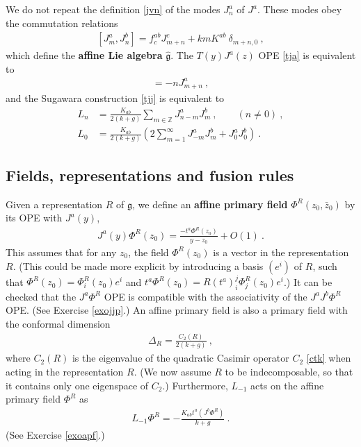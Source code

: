 \documentclass[12pt, a4paper, notitlepage, twoside]{report}
\numberwithin{equation}{section}
\theoremstyle{break}
\begin{document}
We do not repeat the definition \eqref{jvn} of the modes $J^a_n$ of $J^a$.
These modes obey the commutation relations
\begin{align}
 \boxed{[J^a_m,J^b_n] =   f^{ab}_c J^c_{m+n} +kmK^{ab}\ \delta_{m+n,0}} \ , 
\label{jam}
\end{align}
which define the \textbf{\boldmath affine Lie algebra} $\hat{\mathfrak{g}}$. 
The $T(y)J^a(z)$ OPE \eqref{tja} is equivalent to
\begin{align}
 [L_m,J^a_n] = -nJ^a_{m+n}\ ,
\end{align}
and the Sugawara construction \eqref{tjj} is equivalent to 
\begin{align}
 L_n &= \frac{K_{ab}}{2(k+g)} \sum_{m\in{\mathbb{Z}}} J^a_{n-m}J^b_m\ , \qquad (n\neq 0)\ ,
\label{ljj}
\\
L_0 & = \frac{K_{ab}}{2(k+g)}\left(2\sum_{m=1}^\infty J^a_{-m}J^b_m + J^a_0J^b_0\right)\ .
\label{lzjj}
\end{align}

\subsection{Fields, representations and fusion rules}
 
Given a representation $R$ of $\mathfrak{g}$, we define an \textbf{\boldmath affine primary field} $\Phi^{R}(z_0,\bar{z}_0)$ by its OPE with $J^a(y)$,
\begin{align}
 \boxed{ J^a(y) \Phi^{R}(z_0) = \frac{-t^a\Phi^{R}(z_0)}{y-z_0} + O(1) } \ .
\label{jpr}
\end{align}
This assumes that for any $z_0$, the field $\Phi^{R}(z_0)$ is a vector in the representation $R$. (This could be made more explicit by introducing  a basis $(e^i)$ of $R$, such that $\Phi^{R}(z_0) = \Phi^{R}_i(z_0)e^i$ and $t^a \Phi^{R}(z_0) = R(t^a)_i^j \Phi^{R}_j(z_0)e^i$.) 
It can be checked that the $J^a\Phi^R$ OPE is compatible with the associativity of the $J^aJ^b\Phi^R$ OPE. (See Exercise \ref{exojjp}.)
An affine primary field is also a primary field with the conformal dimension 
\begin{align}
 \boxed{\Delta_R  = \frac{C_2(R)}{2(k+g)}}\ ,
\label{dr}
\end{align}
where $C_2(R)$ is the eigenvalue of the quadratic Casimir operator $C_2$ \eqref{ctk} when acting in the representation $R$. (We now assume $R$ to be indecomposable, so that it contains only one eigenspace of $C_2$.) Furthermore, $L_{-1}$ acts on the affine primary field $\Phi^R$ as 
\begin{align}
L_{-1}\Phi^R = -\frac{K_{ab}t^a(J^b\Phi^R)}{k+g} \ .
\label{lmp}
\end{align}
(See Exercise \ref{exoapf}.)
\end{document}
